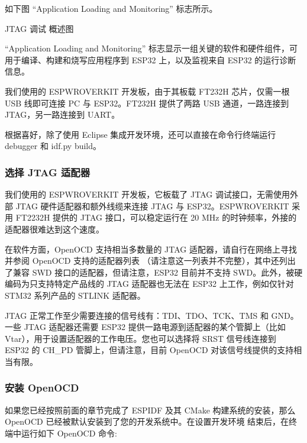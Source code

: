 \documentclass[a4paper,12pt,english]{sphinxmanual}
\begin{document}
\sphinxAtStartPar
如下图 “Application Loading and Monitoring” 标志所示。

\sphinxAtStartPar
{}
JTAG 调试 \sphinxhyphen{} 概述图

\sphinxAtStartPar
“Application Loading and Monitoring” 标志显示一组关键的软件和硬件组件，可用于编译、构建和烧写应用程序到 ESP32 上，以及监视来自 ESP32 的运行诊断信息。

\sphinxAtStartPar
我们使用的 ESP\sphinxhyphen{}WROVER\sphinxhyphen{}KIT 开发板，由于其板载 FT232H 芯片，仅需一根 USB 线即可连接 PC 与 ESP32。FT232H 提供了两路 USB 通道，一路连接到 JTAG，另一路连接到 UART。

\sphinxAtStartPar
根据喜好，除了使用 Eclipse 集成开发环境，还可以直接在命令行终端运行 debugger 和 idf.py build。


\subsubsection{选择 JTAG 适配器}
\label{\detokenize{exp-esp32/ide/esp-idf-cli-debug:jtag}}
\sphinxAtStartPar
我们使用的 ESP\sphinxhyphen{}WROVER\sphinxhyphen{}KIT 开发板，它板载了 JTAG 调试接口，无需使用外部 JTAG 硬件适配器和额外线缆来连接 JTAG 与 ESP32。ESP\sphinxhyphen{}WROVER\sphinxhyphen{}KIT 采用 FT2232H 提供的 JTAG 接口，可以稳定运行在 20 MHz 的时钟频率，外接的适配器很难达到这个速度。

\sphinxAtStartPar
在软件方面，OpenOCD 支持相当多数量的 JTAG 适配器，请自行在网络上寻找并参阅 OpenOCD 支持的适配器列表 （请注意这一列表并不完整），其中还列出了兼容 SWD 接口的适配器，但请注意，ESP32 目前并不支持 SWD。此外，被硬编码为只支持特定产品线的 JTAG 适配器也无法在 ESP32 上工作，例如仅针对 STM32 系列产品的 ST\sphinxhyphen{}LINK 适配器。

\sphinxAtStartPar
JTAG 正常工作至少需要连接的信号线有：TDI、TDO、TCK、TMS 和 GND。一些 JTAG 适配器还需要 ESP32 提供一路电源到适配器的某个管脚上（比如 Vtar），用于设置适配器的工作电压。您也可以选择将 SRST 信号线连接到 ESP32 的 CH\_PD 管脚上，但请注意，目前 OpenOCD 对该信号线提供的支持相当有限。


\subsubsection{安装 OpenOCD}
\label{\detokenize{exp-esp32/ide/esp-idf-cli-debug:openocd}}
\sphinxAtStartPar
如果您已经按照前面的章节完成了 ESP\sphinxhyphen{}IDF 及其 CMake 构建系统的安装，那么 OpenOCD 已经被默认安装到了您的开发系统中。在设置开发环境 结束后，在终端中运行如下 OpenOCD 命令:
\end{document}
